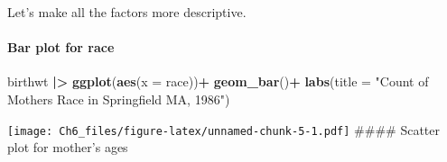 \documentclass[
]{article}
\newenvironment{Shaded}{\begin{snugshade}}{\end{snugshade}}
\newcommand{\AttributeTok}[1]{\textcolor[rgb]{0.13,0.29,0.53}{#1}}
\newcommand{\DecValTok}[1]{\textcolor[rgb]{0.00,0.00,0.81}{#1}}
\newcommand{\FunctionTok}[1]{\textcolor[rgb]{0.13,0.29,0.53}{\textbf{#1}}}
\newcommand{\NormalTok}[1]{#1}
\newcommand{\OtherTok}[1]{\textcolor[rgb]{0.56,0.35,0.01}{#1}}
\newcommand{\SpecialCharTok}[1]{\textcolor[rgb]{0.81,0.36,0.00}{\textbf{#1}}}
\newcommand{\StringTok}[1]{\textcolor[rgb]{0.31,0.60,0.02}{#1}}
\begin{document}
Let's make all the factors more descriptive.

\begin{Shaded}
\end{Shaded}

\paragraph{Bar plot for race}\label{bar-plot-for-race}

\begin{Shaded}
\begin{Highlighting}[]
\NormalTok{birthwt }\SpecialCharTok{|\textgreater{}} \FunctionTok{ggplot}\NormalTok{(}\FunctionTok{aes}\NormalTok{(}\AttributeTok{x =}\NormalTok{ race))}\SpecialCharTok{+}
  \FunctionTok{geom\_bar}\NormalTok{()}\SpecialCharTok{+}
  \FunctionTok{labs}\NormalTok{(}\AttributeTok{title =} \StringTok{"Count of Mother\textquotesingle{}s Race in Springfield MA, 1986"}\NormalTok{)}
\end{Highlighting}
\end{Shaded}

\texttt{[image: Ch6\_files/figure-latex/unnamed-chunk-5-1.pdf]} \#\#\#\#
Scatter plot for mother's ages
\end{document}
